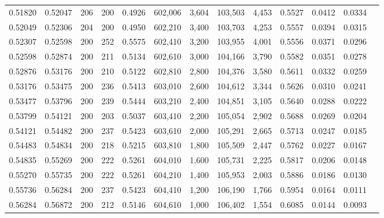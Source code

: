 \begin{tabular}{rrrrrrrrrrrrr}
0.51820 & 0.52047 &   206 & 200 &                                     0.4926 & 602,006 &   3,604 & 103,503 &   4,453 & 0.5527 & 0.0412 & 0.0334 \\
0.52049 & 0.52306 &   204 & 200 &                                     0.4950 & 602,210 &   3,400 & 103,703 &   4,253 & 0.5557 & 0.0394 & 0.0315 \\
0.52307 & 0.52598 &   200 & 252 &                                     0.5575 & 602,410 &   3,200 & 103,955 &   4,001 & 0.5556 & 0.0371 & 0.0296 \\
0.52598 & 0.52874 &   200 & 211 &                                     0.5134 & 602,610 &   3,000 & 104,166 &   3,790 & 0.5582 & 0.0351 & 0.0278 \\
0.52876 & 0.53176 &   200 & 210 &                                     0.5122 & 602,810 &   2,800 & 104,376 &   3,580 & 0.5611 & 0.0332 & 0.0259 \\
0.53176 & 0.53475 &   200 & 236 &                                     0.5413 & 603,010 &   2,600 & 104,612 &   3,344 & 0.5626 & 0.0310 & 0.0241 \\
0.53477 & 0.53796 &   200 & 239 &                                     0.5444 & 603,210 &   2,400 & 104,851 &   3,105 & 0.5640 & 0.0288 & 0.0222 \\
0.53799 & 0.54121 &   200 & 203 &                                     0.5037 & 603,410 &   2,200 & 105,054 &   2,902 & 0.5688 & 0.0269 & 0.0204 \\
0.54121 & 0.54482 &   200 & 237 &                                     0.5423 & 603,610 &   2,000 & 105,291 &   2,665 & 0.5713 & 0.0247 & 0.0185 \\
0.54483 & 0.54834 &   200 & 218 &                                     0.5215 & 603,810 &   1,800 & 105,509 &   2,447 & 0.5762 & 0.0227 & 0.0167 \\
0.54835 & 0.55269 &   200 & 222 &                                     0.5261 & 604,010 &   1,600 & 105,731 &   2,225 & 0.5817 & 0.0206 & 0.0148 \\
0.55270 & 0.55735 &   200 & 222 &                                     0.5261 & 604,210 &   1,400 & 105,953 &   2,003 & 0.5886 & 0.0186 & 0.0130 \\
0.55736 & 0.56284 &   200 & 237 &                                     0.5423 & 604,410 &   1,200 & 106,190 &   1,766 & 0.5954 & 0.0164 & 0.0111 \\
0.56284 & 0.56872 &   200 & 212 &                                     0.5146 & 604,610 &   1,000 & 106,402 &   1,554 & 0.6085 & 0.0144 & 0.0093 \\

\end{tabular}
